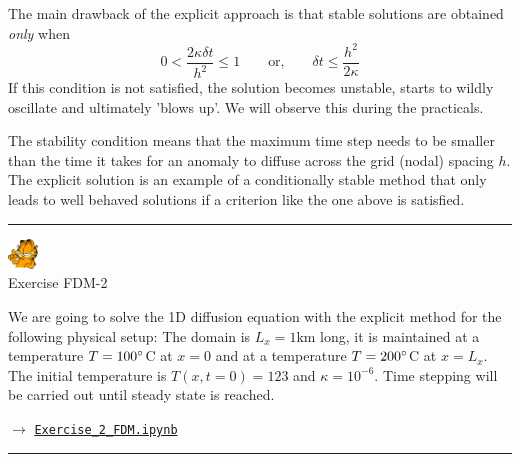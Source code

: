 \noindent The main drawback of the explicit approach is that stable solutions are
obtained {\it only} when
\begin{equation}
0 < \frac{2\kappa \delta t}{h^2} \leq1
\qquad
\text{or,}
\qquad
\delta t \leq \frac{h^2}{2 \kappa}
\end{equation}
If this condition is not satisfied, the solution becomes {\color{olive} unstable}, starts to
wildly oscillate and ultimately 'blows up'. We will observe this during the practicals. 

The stability condition means that the maximum time step needs to be smaller than the time it
takes for an anomaly to diffuse across the grid (nodal) spacing $h$.
The explicit solution is an example of a {\color{olive} conditionally stable method}
that only leads to well behaved solutions if a criterion like the one above is satisfied.

\begin{center}
\begin{minipage}[t]{0.77\textwidth}
\par\noindent\rule{\textwidth}{0.4pt}

\begin{center}
\includegraphics[width=0.8cm]{images/garftr} \\
{\color{orange}Exercise FDM-2}
\end{center}

We are going to solve the 1D diffusion equation with the explicit method
for the following physical setup: The domain is $L_x=1$km long, 
it is maintained at a temperature $T=100\degree$C at $x=0$ and at a temperature
$T=200\degree$C at $x=L_x$. The initial temperature is $T(x,t=0)=123$
and $\kappa=10^{-6}$. 
Time stepping will be carried out until steady state is reached.

$\rightarrow$ 
\href{http://cedricthieulot.net/images/compgeo/Exercise_2_FDM.ipynb}
{\tt Exercise\_2\_FDM.ipynb}

\par\noindent\rule{\textwidth}{0.4pt}
\end{minipage}
\end{center}

